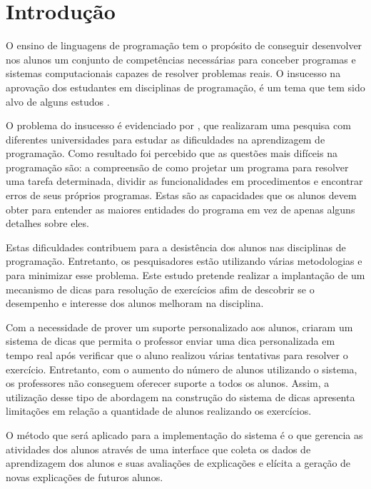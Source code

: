 \chapter{Introdução}

O ensino de linguagens de programação tem o propósito de conseguir desenvolver nos alunos um conjunto de competências necessárias para conceber programas e sistemas computacionais capazes de resolver problemas reais. O insucesso na aprovação dos estudantes em disciplinas de programação, é um tema que tem sido alvo de alguns estudos \cite{bosse2015reprovaccoes, Cukierman:2015:PSU:2729094.2742623}.

O problema do insucesso é evidenciado por , que realizaram uma pesquisa com diferentes universidades para estudar as dificuldades na aprendizagem de programação. Como resultado foi percebido que as questões mais difíceis na programação são: a compreensão de como projetar um programa para resolver uma tarefa determinada, dividir as funcionalidades em procedimentos e encontrar erros de seus próprios programas. Estas são as capacidades que os alunos devem obter para entender as maiores entidades do programa em vez de apenas alguns detalhes sobre eles.

Estas dificuldades contribuem para a desistência dos alunos nas disciplinas de programação. Entretanto, os pesquisadores estão utilizando várias metodologias e  para minimizar esse problema. Este estudo pretende realizar a implantação de um mecanismo de dicas para resolução de exercícios afim de descobrir se o desempenho e interesse dos alunos melhoram na disciplina. 

Com a necessidade de prover um suporte personalizado aos alunos,  criaram um sistema de dicas que permita o professor enviar uma dica personalizada em tempo real após verificar que o aluno realizou várias tentativas para resolver o exercício. Entretanto, com o aumento do número de alunos utilizando o sistema, os professores não conseguem oferecer suporte a todos os alunos. Assim, a utilização desse tipo de abordagem na construção do sistema de dicas apresenta limitações em relação a quantidade de alunos realizando os exercícios.

O método que será aplicado para a implementação do sistema é o  que gerencia as atividades dos alunos através de uma interface que coleta os dados de aprendizagem dos alunos e suas avaliações de explicações e elícita a geração de novas explicações de futuros alunos.

